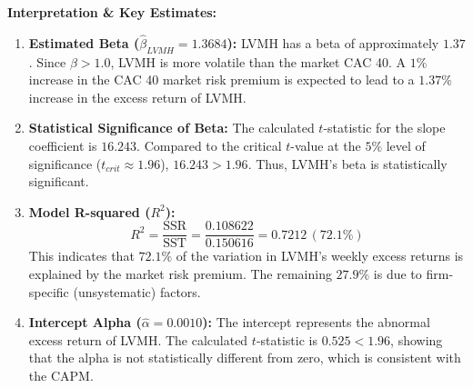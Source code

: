 \begin{tcolorbox}
\textbf{Interpretation \& Key Estimates:}
\begin{enumerate}
	\item \textbf{Estimated Beta ($\hat{\beta}_{LVMH} = 1.3684$):}
	LVMH has a beta of approximately $1.37$. Since $\beta > 1.0$, LVMH is more volatile than the market CAC 40. A $1\%$ increase in the CAC 40 market risk premium is expected to lead to a $1.37\%$ increase in the excess return of LVMH.
	\item \textbf{Statistical Significance of Beta:}
	The calculated $t$-statistic for the slope coefficient is $16.243$. Compared to the critical $t$-value at the $5\%$ level of significance ($t_{crit} \approx 1.96$), $16.243 > 1.96$. Thus, LVMH's beta is statistically significant.
	\item \textbf{Model R-squared ($R^2$):}
	\[ R^2 = \frac{\text{SSR}}{\text{SST}} = \frac{0.108622}{0.150616} = 0.7212 \, (72.1\%) \]
	This indicates that $72.1\%$ of the variation in LVMH's weekly excess returns is explained by the market risk premium. The remaining $27.9\%$ is due to firm-specific (unsystematic) factors.
	\item \textbf{Intercept Alpha ($\hat{\alpha} = 0.0010$):}
	The intercept represents the abnormal excess return of LVMH. The calculated $t$-statistic is $0.525 < 1.96$, showing that the alpha is not statistically different from zero, which is consistent with the CAPM.
\end{enumerate}
\end{tcolorbox}

